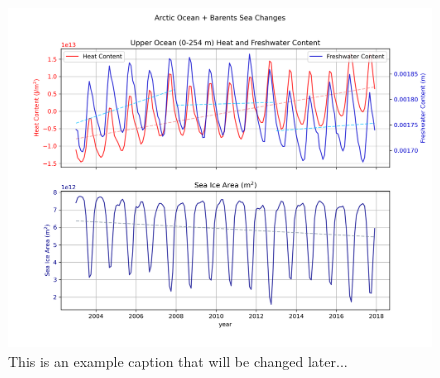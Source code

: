 \documentclass[draft]{agujournal2019}
\begin{document}
\begin{figure}
    \includegraphics[width=\linewidth]{figs/Arctic_timeseries_proposal.png}
    \caption{This is an example caption that will be changed later...}
    \label{fig:timeseries}
\end{figure}
\end{document}
